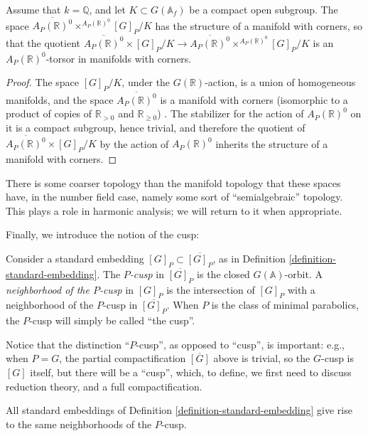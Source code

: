 \begin{lemma}
 \label{lemma-manifold-corners}
Assume that $k=\mathbb Q$, and let $K\subset G(\mathbb A_f)$ be a compact open subgroup. The space $\overline{A_P(\mathbb R)^0} \times^{A_P(\mathbb R)^0} [G]_P/K$ has the structure of a manifold with corners, so that the quotient $\overline{A_P(\mathbb R)^0} \times [G]_P/K \to \overline{A_P(\mathbb R)^0} \times^{A_P(\mathbb R)^0} [G]_P/K$ is an ${A_P(\mathbb R)^0}$-torsor in manifolds with corners. 
\end{lemma}

\begin{proof}
 The space $[G]_P/K$, under the $G(\mathbb R)$-action, is a union of homogeneous manifolds, and the space $\overline{A_P(\mathbb R)^0}$ is a manifold with corners (isomorphic to a product of copies of $\mathbb R_{>0}$ and $\mathbb R_{\ge 0}$) . The stabilizer for the action of $A_P(\mathbb R)^0$ on it is a compact subgroup, hence trivial, and therefore the quotient of $\overline{A_P(\mathbb R)^0} \times [G]_P/K$ by the action of $A_P(\mathbb R)^0$ inherits the structure of a manifold with corners.
\end{proof}

There is some coarser topology than the manifold topology that these spaces have, in the number field case, namely some sort of ``semialgebraic'' topology. This plays a role in harmonic analysis; we will return to it when appropriate.

Finally, we introduce the notion of the cusp:
\begin{definition}
 \label{definition-P-cusp}
 Consider a standard embedding $[G]_P \subset \overline{[G]_P}$, as in Definition \ref{definition-standard-embedding}. The {\it $P$-cusp} in $\overline{[G]_P}$ is the closed $G(\mathbb A)$-orbit. A {\it neighborhood of the $P$-cusp} in $[G]_P$ is the intersection of $[G]_P$ with a neighborhood of the $P$-cusp in $\overline{[G]_P}$. When $P$ is the class of minimal parabolics, the $P$-cusp will simply be called ``the cusp''. 
\end{definition}

Notice that the distinction ``$P$-cusp'', as opposed to ``cusp'', is important: e.g., when $P=G$, the partial compactification $\overline{[G]}$ above is trivial, so the $G$-cusp is $[G]$ itself, but there will be a ``cusp'', which, to define, we first need to discuss reduction theory, and a full compactification. 

\begin{lemma}
\label{lemma-definitions-cusp-equivalent}
All standard embeddings of Definition \ref{definition-standard-embedding} give rise to the same neighborhoods of the $P$-cusp.
\end{lemma}


